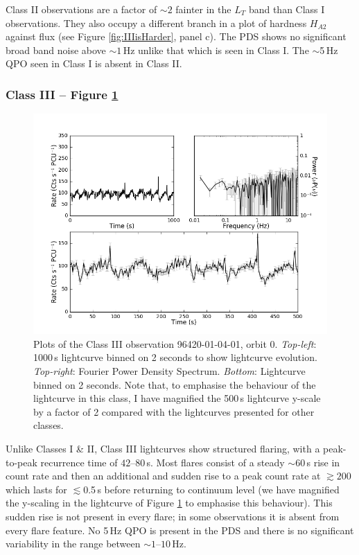 \par Class II observations are a factor of $\sim2$ fainter in the $L_T$ band than Class I observations.  They also occupy a different branch in a plot of hardness $H_{A2}$ against flux (see Figure \ref{fig:IIIisHarder}, panel c).  The PDS shows no significant broad band noise above $\sim1$\,Hz unlike that which is seen in Class I.  The $\sim$5\,Hz QPO seen in Class I is absent in Class II.

\subsubsection{Class III -- Figure \ref{fig:Gmulti}}
\label{sec:classIII}

\begin{figure}
    \includegraphics[width=0.8\columnwidth, trim = 0.6cm 0 3.9cm 0]{images/Gmulti.png}
    \captionsetup{singlelinecheck=off}
    \caption[Characteristic lightcurves and a power spectrum of Type III variability.]{Plots of the Class III observation 96420-01-04-01, orbit 0.  \textit{Top-left}: 1000\,s lightcurve binned on 2 seconds to show lightcurve evolution.  \textit{Top-right}: Fourier Power Density Spectrum.  \textit{Bottom}: Lightcurve binned on 2 seconds.  Note that, to emphasise the behaviour of the lightcurve in this class, I have magnified the 500\,s lightcurve y-scale by a factor of 2 compared with the lightcurves presented for other classes.}
   \label{fig:Gmulti}
\end{figure}

\par Unlike Classes I \& II, Class III lightcurves show structured flaring, with a peak-to-peak recurrence time of $42$--$80$\,s.  Most flares consist of a steady $\sim60$\,s rise in count rate and then an additional and sudden rise to a peak count rate at $\gtrsim200$\spcu which lasts for $\lesssim$0.5\,s before returning to continuum level (we have magnified the y-scaling in the lightcurve of Figure \ref{fig:Gmulti} to emphasise this behaviour). This sudden rise is not present in every flare; in some observations it is absent from every flare feature.  No 5\,Hz QPO is present in the PDS and there is no significant variability in the range between $\sim1\mbox{--}10$\,Hz.

